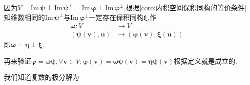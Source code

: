 \begin{formal}
\begin{Proof}
        因为$V=\mathrm{Im}\,\bm{\psi}\perp\mathrm{Im}\,\bm{\psi}^{\perp}=\mathrm{Im}\,\bm{\varphi}\perp\mathrm{Im}\,\bm{\varphi}^{\perp}$,根据\cref{coro:内积空间保积同构的等价条件}知维数相同的$\mathrm{Im}\,\bm{\psi}^{\perp}$与$\mathrm{Im}\,\bm{\varphi}^{\perp}$一定存在保积同构$\bm{\xi}$,作\begin{align*}
            \bm{\omega}:V&\longrightarrow V\\
            \left(
                \bm{\psi}\left(\bm{v}\right),\bm{u}
            \right)&\longmapsto\left(
                \bm{\varphi}\left(\bm{v}\right),\bm{\xi}\left(\bm{u}\right)
            \right)
        \end{align*}即$\bm{\omega}=\bm{\eta}\perp\bm{\xi}$.

        再来验证$\bm{\varphi}=\bm{\omega\psi},\forall\bm{v}\in V:\bm{\varphi}\left(\bm{v}\right)=\bm{\omega\psi}\left(\bm{v}\right)=\bm{\eta}\bm{\psi}\left(\bm{v}\right)$根据定义就是成立的.
    \end{Proof}
\end{formal}
我们知道复数的极分解为

